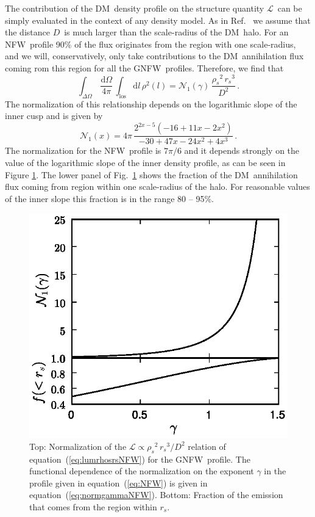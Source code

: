 \documentclass[aps,prd,twocolumn,amsmath,amssymb,floatfix,nofootinbib,10pt]{revtex4}
\newcommand{\NFW}{NFW}
\newcommand{\GNFW}{G\NFW}
\newcommand{\DM}{DM}
\newcommand{\dd}{\mathrm{d}}
\newcommand{\eqnname}{equation}
\newcommand{\los}{los}
\newcommand{\lum}{\ensuremath{\mathcal{L}}}
\newcommand{\rhos}{\ensuremath{\rho_s}}
\newcommand{\rs}{\ensuremath{r_s}}
\newcommand{\dist}{\ensuremath{D}}
\newcommand{\norm}{\ensuremath{\mathcal{N}}}
\newcommand{\normnfw}{\ensuremath{\norm_1}}
\begin{document}
The contribution of the \DM\ density profile on the structure quantity
\lum\ can be simply evaluated in the context of any density model. As
in Ref.~\cite{2007PhRvD..75h3526S} we assume that the distance
\dist\ is much larger than the scale-radius of the \DM\ halo. For an
\NFW\ profile 90\% of the flux originates from the region with one
scale-radius, and we will, conservatively, only take contributions to
the \DM\ annihilation flux coming rom this region for all the
\GNFW\ profiles. Therefore, we find that 
\begin{equation}\label{eq:lumrhosrsNFW}
\int_{\Delta\Omega}\,\frac{\dd\Omega}{4\pi}\,\int_{\mathrm{\los}} \dd
l\, \rho^2(l)= \normnfw(\gamma)\, \frac{\rhos^2\, \rs^3}{\dist^2}\, .
\end{equation}
The normalization of this relationship depends on the logarithmic
slope of the inner cusp and is given by
\begin{equation}\label{eq:normgammaNFW}
\normnfw(x) = 4 \pi  \, \frac{2^{2x-5}\left(-16+11x-2x^2\right)}{-30+47x-24x^2+4x^3}\, .
\end{equation}
The normalization for the \NFW\ profile is $7\pi/6$ and it depends
strongly on the value of the logarithmic slope of the inner density
profile, as can be seen in Figure \ref{fig:normgammaNFW}. The lower
panel of Fig.~\ref{fig:normgammaNFW} shows the fraction of the \DM\
annihilation flux coming from region within one scale-radius of the
halo. For reasonable values of the inner slope this fraction is in the
range 80 -- 95\%.

\begin{figure}[t]
\centering
\includegraphics{normgammaNFW.eps}
\caption{Top: Normalization of the $\lum \propto \rhos^2\,
\rs^3/\dist^2$ relation of \eqnname\ (\ref{eq:lumrhosrsNFW}) for the
\GNFW\ profile. The functional dependence of the normalization on the
exponent $\gamma$ in the profile given in \eqnname\ (\ref{eq:NFW}) is
given in \eqnname\ (\ref{eq:normgammaNFW}). Bottom: Fraction of the
emission that comes from the region within \rs.}%
\label{fig:normgammaNFW}%
\end{figure}
\end{document}
